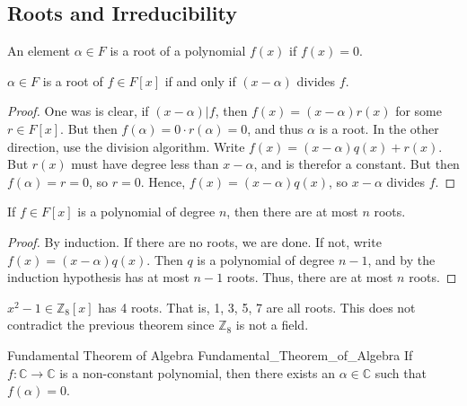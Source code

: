     \subsection{Roots and Irreducibility}
        \begin{definition}
            An element $\alpha\in{F}$ is a root of a polynomial $f(x)$ if
            $f(x)=0$.
        \end{definition}
        \begin{theorem}
            $\alpha\in{F}$ is a root of $f\in{F}[x]$ if and only if
            $(x-\alpha)$ divides $f$.
        \end{theorem}
        \begin{proof}
            One was is clear, if $(x-\alpha)|f$, then $f(x)=(x-\alpha)r(x)$
            for some $r\in{F}[x]$. But then $f(\alpha)=0\cdot{r}(\alpha)=0$,
            and thus $\alpha$ is a root. In the other direction, use the
            division algorithm. Write $f(x)=(x-\alpha)q(x)+r(x)$. But $r(x)$
            must have degree less than $x-\alpha$, and is therefor a
            constant. But then $f(\alpha)=r=0$, so $r=0$. Hence,
            $f(x)=(x-\alpha)q(x)$, so $x-\alpha$ divides $f$.
        \end{proof}
        \begin{theorem}
            If $f\in{F}[x]$ is a polynomial of degree $n$, then there are at
            most $n$ roots.
        \end{theorem}
        \begin{proof}
            By induction. If there are no roots, we are done. If not, write
            $f(x)=(x-\alpha)q(x)$. Then $q$ is a polynomial of degree $n-1$,
            and by the induction hypothesis has at most $n-1$ roots. Thus,
            there are at most $n$ roots.
        \end{proof}
        \begin{example}
            $x^{2}-1\in\mathbb{Z}_{8}[x]$ has 4 roots. That is, 1, 3, 5, 7
            are all roots. This does not contradict the previous theorem
            since $\mathbb{Z}_{8}$ is not a field.
        \end{example}
        \begin{ftheorem}{Fundamental Theorem of Algebra}
                        {Fundamental_Theorem_of_Algebra}
            If $f:\mathbb{C}\rightarrow\mathbb{C}$ is a non-constant
            polynomial, then there exists an $\alpha\in\mathbb{C}$ such that
            $f(\alpha)=0$.
        \end{ftheorem}
